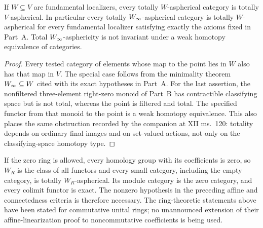 \begin{proposition}\label{D:general-localizer}
If $W\subseteq V$ are fundamental localizers, every totally $W$-aspherical category is totally $V$-aspherical. In particular every totally $W_{\infty}$-aspherical category is totally $W$-aspherical for every fundamental localizer satisfying exactly the axioms fixed in Part~A. Total $W_{\infty}$-asphericity is not invariant under a weak homotopy equivalence of categories.
\end{proposition}
\begin{proof}
Every tested category of elements whose map to the point lies in $W$ also has that map in $V$. The special case follows from the minimality theorem $W_{\infty}\subseteq W$ cited with its exact hypotheses in Part~A. For the last assertion, the nonfiltered three-element right-zero monoid of Part~B has contractible classifying space but is not total, whereas the point is filtered and total. The specified functor from that monoid to the point is a weak homotopy equivalence. This also places the same obstruction recorded by the companion at XII ms.~120: totality depends on ordinary final images and on set-valued actions, not only on the classifying-space homotopy type.
\end{proof}

\begin{remark}\label{D:zero-ring}
If the zero ring is allowed, every homology group with its coefficients is zero, so $W_R$ is the class of all functors and every small category, including the empty category, is totally $W_R$-aspherical. Its module category is the zero category, and every colimit functor is exact. The nonzero hypothesis in the preceding affine and connectedness criteria is therefore necessary. The ring-theoretic statements above have been stated for commutative unital rings; no unannounced extension of their affine-linearization proof to noncommutative coefficients is being used.
\end{remark}
